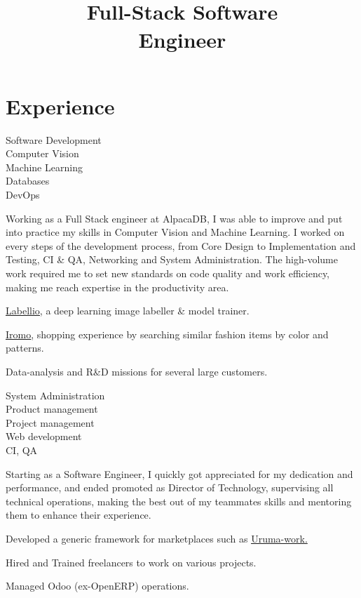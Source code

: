 \documentclass[a4paper,11pt]{cv4tw}%
\title{\\ Full-Stack Software\\Engineer}
\begin{document}
\section{Experience}
{Software Development\\Computer Vision\\ Machine Learning\\Databases\\DevOps}
    { Working as a Full Stack engineer at AlpacaDB, I was able to improve and put
      into practice my skills in Computer Vision and Machine Learning. I
      worked on every steps of the development process, from Core Design to
      Implementation and Testing, CI \& QA, Networking and System Administration.
      The high-volume work required me to set new standards on code quality and work
      efficiency, making me reach expertise in the productivity area.
	\begin{missions}
        \item \underline{\href{http://www.labell.io/}{Labellio}}, a deep
            learning image labeller \& model trainer.
        \item \underline{\href{http://iromo.jp}{Iromo}}, shopping experience by
            searching similar fashion items by color and patterns.
        \item Data-analysis and R\&D missions for several large customers.
	\end{missions}
}
{System Administration\\Product management\\Project management\\Web
development\\CI, QA}
	{ Starting as a Software Engineer, I quickly got appreciated for my
      dedication and performance, and ended promoted as Director of
      Technology, supervising all technical operations, making the best out of
      my teammates skills and mentoring them to enhance their experience.
	\begin{missions}
        \item Developed a generic framework for marketplaces such as
            \underline{\href{https://uruma-work.com}{Uruma-work}.}
        \item Hired and Trained freelancers to work on various projects.
        \item Managed Odoo (ex-OpenERP) operations.
	\end{missions}
}
\end{document}
